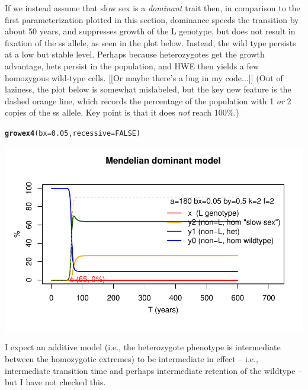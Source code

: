 \documentclass{article}\usepackage[]{graphicx}\usepackage[]{color}
\makeatletter
\def\maxwidth{ %
  \ifdim\Gin@nat@width>\linewidth
    \linewidth
  \else
    \Gin@nat@width
  \fi
}
\newcommand{\hlnum}[1]{\textcolor[rgb]{0.686,0.059,0.569}{#1}}%
\newcommand{\hlstd}[1]{\textcolor[rgb]{0.345,0.345,0.345}{#1}}%
\newcommand{\hlkwc}[1]{\textcolor[rgb]{0.333,0.667,0.333}{#1}}%
\newcommand{\hlkwd}[1]{\textcolor[rgb]{0.737,0.353,0.396}{\textbf{#1}}}%
\newenvironment{kframe}{%
 \def\at@end@of@kframe{}%
 \ifinner\ifhmode%
  \def\at@end@of@kframe{\end{minipage}}%
  \begin{minipage}{\columnwidth}%
 \fi\fi%
 \def\FrameCommand##1{\hskip\@totalleftmargin \hskip-\fboxsep
 \colorbox{shadecolor}{##1}\hskip-\fboxsep
     \hskip-\linewidth \hskip-\@totalleftmargin \hskip\columnwidth}%
 \MakeFramed {\advance\hsize-\width
   \@totalleftmargin\z@ \linewidth\hsize
   \@setminipage}}%
 {\par\unskip\endMakeFramed%
 \at@end@of@kframe}
\newenvironment{knitrout}{}{} %
\makeatother
\begin{document}
If we instead assume that slow sex is a \textit{dominant} trait then, in comparison to the first
parameterization plotted in this section, dominance speeds the transition by about 50 years, and
suppresses growth of the L genotype, but does not result in fixation of the ss allele, as seen in
the plot below.  Instead, the wild type persists at a low but stable level.  Perhaps because
heterozygotes get the growth advantage, hets persist in the population, and HWE then yields a few
homozygous wild-type cells.  [[Or maybe there's a bug in my code...]]  (Out of laziness, the plot
below is somewhat mislabeled, but the key new feature is the dashed orange line, which records the
percentage of the population with 1 \textit{or} 2 copies of the ss allele.  Key point is that it
does \textit{not} reach 100\%.)

\begin{knitrout}\footnotesize
{}\color{fgcolor}\begin{kframe}
\begin{alltt}
\hlkwd{growex4}\hlstd{(}\hlkwc{bx}\hlstd{=}\hlnum{0.05}\hlstd{,}\hlkwc{recessive}\hlstd{=}\hlnum{FALSE}\hlstd{)}
\end{alltt}
\end{kframe}

{\centering \includegraphics[width=\maxwidth]{asex-figs-knitr/unnamed-chunk-25-1} 

}



\end{knitrout}

I expect an additive model (i.e., the heterozygote phenotype is intermediate between the homozygotic
extremes) to be intermediate in effect -- i.e., intermediate transition time and perhaps
intermediate retention of the wildtype -- but I have not checked this.
\end{document}
